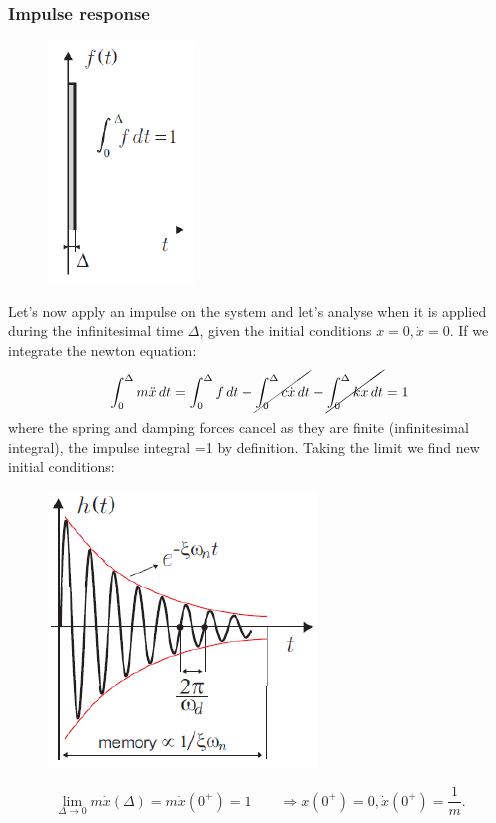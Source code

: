 			\subsubsection{Impulse response}
				\begin{figure}
				\vspace{-5mm}
				\includegraphics[scale=0.6]{ch1/6}
				\end{figure}
				Let's now apply an impulse on the system and let's analyse when it is applied during the infinitesimal time $\Delta$, given the initial conditions $x = 0, \dot{x}=0$. If we integrate the newton equation:
				\begin{equation}
				\int _0 ^\Delta m \ddot{x} \,dt = \int _0 ^\Delta f \,dt - \cancel{\int _0 ^\Delta c \dot{x}\,dt} - \cancel{\int _0 ^\Delta kx\,dt} = 1
				\end{equation}				 
				where the spring and damping forces cancel as they are finite (infinitesimal integral), the impulse integral =1 by definition. Taking the limit we find new initial conditions:
				
				\begin{figure}
				\vspace{-5mm}
				\includegraphics[scale=0.5]{ch1/7}
				\end{figure}
				\begin{equation}
				\lim _{\Delta \rightarrow 0} m\dot{x}(\Delta) = m\dot{x}(0^+) = 1  \qquad \Rightarrow x(0^+) = 0, \dot{x}(0^+) = \frac{1}{m}.
				\end{equation}

